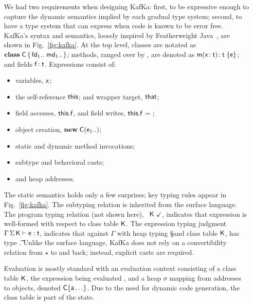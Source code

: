 \documentclass[a4paper,UKenglish]{lipics-v2018}
\newcommand{\EM}[1]{\ensuremath{#1}\xspace}
\newcommand{\xt}[1]{{\sf{#1}}}
\newcommand{\bt}[1]{\xt{\bf #1}}
\newcommand{\EMxt}[1]{\EM{\xt{#1}}}
\newcommand{\x}{\EMxt x}
\newcommand{\m}{\EMxt m}
\newcommand{\s}{\EM{\sigma}}
\newcommand{\K}{\EMxt K}
\newcommand{\Env}{\EM{\Gamma}}
\newcommand{\any}{\EM{\star}}
\newcommand{\this}{\EMxt{this}}
\newcommand{\that}{\EMxt{that}}
\newcommand{\FRead}[1]{\EM{\this.#1}}
\newcommand{\FWrite}[2]{\EM{\this.#1} = #2}
\newcommand{\New}[2]{\EM{\new\;#1(#2)}}
\newcommand{\new}{\EM{\bt{new}}}
\newcommand{\HT}[2]{\EM{{#1}\!:{#2}}}
\newcommand{\Mdef}[5]{\EM{ \HT{ #1( \HT{#2}{#3})}{#4}\;\{{#5}\}}}
\newcommand{\Class}[3]{\EM{\bt{class}\;#1\,\{\,#2~#3\,\}}}
\newcommand{\Fdef}[2]{\EM{ \HT{#1}{#2} }}
\newcommand{\OK}{\EM{~\checkmark}}
\newcommand{\EnvType}[5]{ \EM{#1\,#2\,#3\vdash #4 : #5}}
\newcommand{\WFp}[2]{#1~#2\OK}
\newcommand{\figref}[1]{Fig.~\ref{#1}\xspace}
\newcommand{\kafka}{{\sf KafKa}\xspace}
\newcounter{rules}
\newcounter{conds}
\newcounter{cond}[conds]
\begin{document}
We had two requirements when designing \kafka: first, to be expressive enough to
capture the dynamic semantics implied by each gradual type system; second,
to have a type system that can express when code is known to be error
free. \kafka's syntax and semantics, loosely inspired by Featherweight
Java~\cite{FJ}, are shown in \figref{fig:kafka}. At the top level, classes
are notated as \Class\C{\fd[1]..}{\md[1]..}; methods, ranged over by \md,
are denoted as \Mdef\m\x\t\t\e; and fields \Fdef\f\t. Expressions consist
of:
\begin{itemize}
\item variables, \x;
\item the self-reference \this; and wrapper target, \that;
\item field accesses, \FRead\f, and field writes, \FWrite\f\e;
\item object creation, \New\C{\e[1]..};
\item static and dynamic method invocations;
\item subtype and behavioral casts;
\item and heap addresses.
\end{itemize}
The static semantics holds only a few surprises; key typing rules appear in
\figref{fig:kafka}. The subtyping relation is inherited from the surface
language. The program typing relation (not shown here), \WFp\e\K, indicates
that expression \e is well-formed with respect to class table \K. The
expression typing judgment $\EnvType \Env\S\K\e\t$, indicates that against
\Env with heap typing \S and class table \K, \e has type \t. Unlike the
surface language, \kafka does not rely on a convertibility relation from
\any to \C and back; instead, explicit casts are required.

Evaluation is mostly standard with an evaluation context consisting of a
class table \K, the expression being evaluated \e, and a heap \s mapping
from addresses \a to objects, denoted $\C\{\a\ldots\}$. Due to the need for
dynamic code generation, the class table is part of the state.

\renewcommand{\S}{\EM{\Sigma}\xspace}
\end{document}

